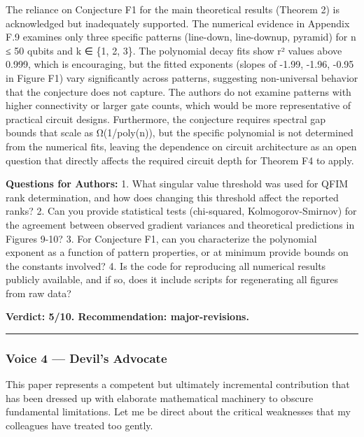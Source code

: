 \documentclass[10pt,letterpaper]{article}
\begin{document}
The reliance on Conjecture F1 for the main theoretical results (Theorem 2) is acknowledged but inadequately supported. The numerical evidence in Appendix F.9 examines only three specific patterns (line-down, line-downup, pyramid) for n ≤ 50 qubits and k ∈ \{1, 2, 3\}. The polynomial decay fits show r² values above 0.999, which is encouraging, but the fitted exponents (slopes of -1.99, -1.96, -0.95 in Figure F1) vary significantly across patterns, suggesting non-universal behavior that the conjecture does not capture. The authors do not examine patterns with higher connectivity or larger gate counts, which would be more representative of practical circuit designs. Furthermore, the conjecture requires spectral gap bounds that scale as Ω(1/poly(n)), but the specific polynomial is not determined from the numerical fits, leaving the dependence on circuit architecture as an open question that directly affects the required circuit depth for Theorem F4 to apply.

\textbf{Questions for Authors:}
1. What singular value threshold was used for QFIM rank determination, and how does changing this threshold affect the reported ranks?
2. Can you provide statistical tests (chi-squared, Kolmogorov-Smirnov) for the agreement between observed gradient variances and theoretical predictions in Figures 9-10?
3. For Conjecture F1, can you characterize the polynomial exponent as a function of pattern properties, or at minimum provide bounds on the constants involved?
4. Is the code for reproducing all numerical results publicly available, and if so, does it include scripts for regenerating all figures from raw data?

\textbf{Verdict: 5/10. Recommendation: major-revisions.}

\begin{center}\rule{0.5\linewidth}{0.5pt}\end{center}

\hypertarget{voice-4-devils-advocate}{%
\subsubsection{Voice 4 --- Devil's Advocate}\label{voice-4-devils-advocate}}

This paper represents a competent but ultimately incremental contribution that has been dressed up with elaborate mathematical machinery to obscure fundamental limitations. Let me be direct about the critical weaknesses that my colleagues have treated too gently.
\end{document}
